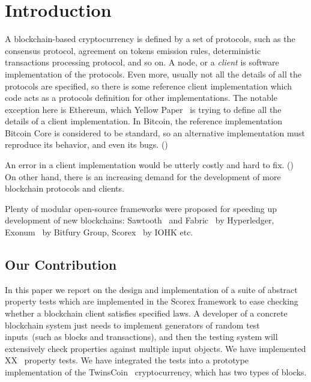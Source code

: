 
\section{Introduction}

A blockchain-based cryptocurrency is defined by a set of protocols, such as the consensus protocol, agreement on tokens emission rules, deterministic transactions processing protocol, and so on. A node, or a {\em client} is software implementation of the protocols. Even more, usually not all the details of all the protocols are specified, so there is some reference client implementation which code acts as a protocols definition for other implementations. The notable exception here is Ethereum, which Yellow Paper~\cite{ethyp} is trying to define all the details of a client implementation. In Bitcoin, the reference implementation Bitcoin Core is considered to be standard, so an alternative implementation must reproduce its behavior, and even its bugs. ()

An error in a client implementation would be utterly costly and hard to fix. () On other hand, there is an increasing demand for the development of more blockchain protocols and clients. 

Plenty of modular open-source frameworks were proposed for speeding up development of new blockchains: Sawtooth~\cite{sawtooth} and Fabric~\cite{fabric} by Hyperledger, Exonum~\cite{exonum} by Bitfury Group, Scorex~\cite{scorex} by IOHK etc. %


\subsection{Our Contribution}

In this paper we report on the design and implementation of a suite of abstract property tests which are implemented in the Scorex framework to ease checking whether a blockchain client satisfies specified laws. A developer of a concrete blockchain system just needs to implement generators of random test inputs~(such as blocks and transactions), and then the testing system will extensively check properties against multiple input objects. We have implemented XX~ property tests. We have integrated the tests into a prototype implementation of the TwinsCoin~ cryptocurrency, which has two types of blocks.  
